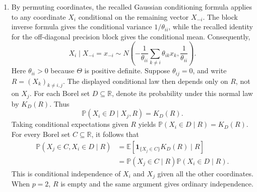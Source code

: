 \documentclass[lang=en,11pt,a4paper,citestyle=authoryear]{elegantpaper}
\newcommand{\R}{\mathbb{R}}
\newcommand{\E}{\mathbb{E}}
\renewcommand{\P}{\mathbb{P}}
\begin{document}
\begin{enumerate}[label=(\arabic*),leftmargin=*]
\item By permuting coordinates, the recalled Gaussian conditioning formula applies to any coordinate $X_i$ conditional on the remaining vector $X_{-i}$. The block inverse formula gives the conditional variance $1/\theta_{ii}$, while the recalled identity for the off-diagonal precision block gives the conditional mean. Consequently,
\[
X_i\mid X_{-i}=x_{-i}\sim
N\!\left(-\frac{1}{\theta_{ii}}\sum_{k\ne i}\theta_{ik}x_k,
\frac{1}{\theta_{ii}}\right).
\]
Here $\theta_{ii}>0$ because $\Theta$ is positive definite.
Suppose $\theta_{ij}=0$, and write $R=(X_k)_{k\ne i,j}$.
The displayed conditional law then depends only on $R$, not on $X_j$.
For each Borel set $D\subseteq\R$, denote its probability under this normal law by $K_D(R)$. Thus
\[
\P(X_i\in D\mid X_j,R)=K_D(R).
\]
Taking conditional expectations given $R$ yields
$\P(X_i\in D\mid R)=K_D(R)$.
For every Borel set $C\subseteq\R$, it follows that
\[
\begin{aligned}
\P(X_j\in C,X_i\in D\mid R)
&=\E[\mathbf{1}_{\{X_j\in C\}}K_D(R)\mid R]\\
&=\P(X_j\in C\mid R)\P(X_i\in D\mid R).
\end{aligned}
\]
This is conditional independence of $X_i$ and $X_j$ given all the other coordinates. When $p=2$, $R$ is empty and the same argument gives ordinary independence.
\end{enumerate}
\end{document}
